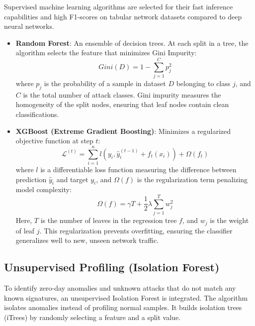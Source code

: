\documentclass[12pt,a4paper]{report}
\begin{document}
Supervised machine learning algorithms are selected for their fast inference capabilities and high F1-scores on tabular network datasets compared to deep neural networks.
\begin{itemize}[leftmargin=1.5em]
  \item \textbf{Random Forest}: An ensemble of decision trees. At each split in a tree, the algorithm selects the feature that minimizes Gini Impurity:
    \begin{equation}
      Gini(D) = 1 - \sum_{j=1}^{C} p_j^2
    \end{equation}
    where $p_j$ is the probability of a sample in dataset $D$ belonging to class $j$, and $C$ is the total number of attack classes. Gini impurity measures the homogeneity of the split nodes, ensuring that leaf nodes contain clean classifications.
  \item \textbf{XGBoost (Extreme Gradient Boosting)}: Minimizes a regularized objective function at step $t$:
    \begin{equation}
      \mathcal{L}^{(t)} = \sum_{i=1}^{n} l\left(y_i, \hat{y}_i^{(t-1)} + f_t(x_i)\right) + \Omega(f_t)
    \end{equation}
    where $l$ is a differentiable loss function measuring the difference between prediction $\hat{y}_i$ and target $y_i$, and $\Omega(f)$ is the regularization term penalizing model complexity:
    \begin{equation}
      \Omega(f) = \gamma T + \frac{1}{2} \lambda \sum_{j=1}^{T} w_j^2
    \end{equation}
    Here, $T$ is the number of leaves in the regression tree $f$, and $w_j$ is the weight of leaf $j$. This regularization prevents overfitting, ensuring the classifier generalizes well to new, unseen network traffic.
\end{itemize}

\subsection{Unsupervised Profiling (Isolation Forest)}

To identify zero-day anomalies and unknown attacks that do not match any known signatures, an unsupervised Isolation Forest is integrated. The algorithm isolates anomalies instead of profiling normal samples. It builds isolation trees (iTrees) by randomly selecting a feature and a split value. 
\end{document}
